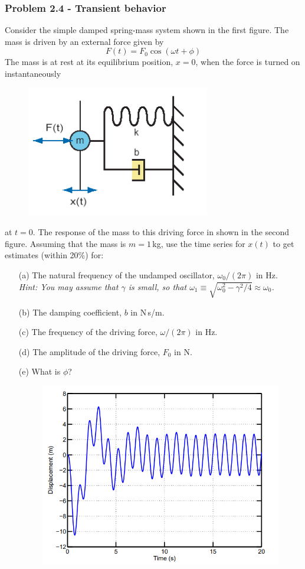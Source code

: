 \documentclass[12pt,a4paper]{article}
\begin{document}
\subsubsection*{Problem 2.4 - Transient behavior}
Consider the simple damped spring-mass system shown in the first figure. The mass is driven by an external force given by
\[F(t)=F_0\cos(\omega t+\phi)\]
The mass is at rest at its equilibrium position, $x=0$, when the force is turned on instantaneously
\begin{figure}[h]
    \centering
    \includegraphics[width=0.4\linewidth]{figs/fig_prob_2.4.png}
\end{figure}
at $t=0$. The response of the mass to this driving force in shown in the second figure. Assuming that the mass is $m=1$\,kg, use the time series for $x(t)$ to get estimates (within 20\%) for:
\begin{enumerate}
    \item[(a)]The natural frequency of the undamped oscillator, $\omega_0/(2\pi)$ in Hz.
    \\\textit{Hint: You may assume that $\gamma$ is small, so that $\omega_1\equiv\sqrt{\omega_0^2-\gamma^2/4}\approx\omega_0$.}
    \item[(b)]The damping coefficient, $b$ in N\,s/m.
    \item[(c)]The frequency of the driving force, $\omega/(2\pi)$ in Hz.
    \item[(d)]The amplitude of the driving force, $F_0$ in N.
    \item[(e)]What is $\phi$?
    \begin{figure}[h]
    \centering
    \includegraphics[width=0.7\linewidth]{figs/fig_prob_2.4e.png}
\end{figure}
\end{enumerate}
\end{document}

